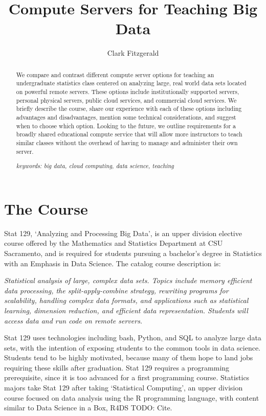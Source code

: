 \documentclass[12pt]{article}
\title{Compute Servers for Teaching Big Data}
\author{Clark Fitzgerald}
\begin{document}
\maketitle

\begin{abstract}

    We compare and contrast different compute server options for teaching an undergraduate statistics class centered on analyzing large, real world data sets located on powerful remote servers.
These options include institutionally supported servers, personal physical servers, public cloud services, and commercial cloud services.
We briefly describe the course, share our experience with each of these options including advantages and disadvantages, mention some technical considerations, and suggest when to choose which option.
Looking to the future, we outline requirements for a broadly shared educational compute service that will allow more instructors to teach similar classes without the overhead of having to manage and administer their own server.

\emph{keywords: big data, cloud computing, data science, teaching}

\end{abstract}



\section{The Course}

Stat 129, `Analyzing and Processing Big Data', is an upper division elective course offered by the Mathematics and Statistics Department at CSU Sacramento, and is required for students pursuing a bachelor's degree in Statistics with an Emphasis in Data Science.
The catalog course description is:

\emph{
Statistical analysis of large, complex data sets. Topics include memory efficient data processing, the split-apply-combine strategy, rewriting programs for scalability, handling complex data formats, and applications such as statistical learning, dimension reduction, and efficient data representation. Students will access data and run code on remote servers.
}

Stat 129 uses technologies including bash, Python, and SQL to analyze large data sets, with the intention of exposing students to the common tools in data science.
Students tend to be highly motivated, because many of them hope to land jobs requiring these skills after graduation.
Stat 129 requires a programming prerequisite, since it is too advanced for a first programming course.
Statistics majors take Stat 129 after taking `Statistical Computing', an upper division course focused on data analysis using the R programming language, with content similar to Data Science in a Box, R4DS TODO: Cite.
\end{document}
